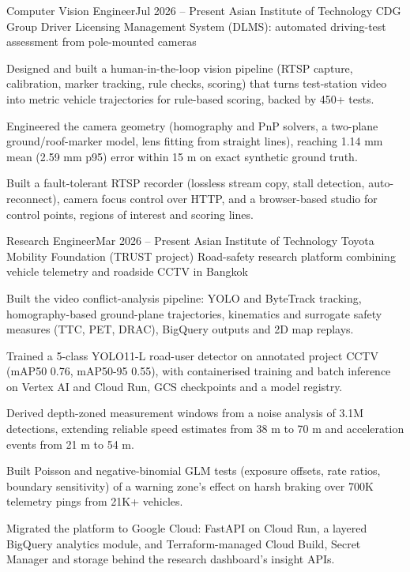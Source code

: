 \documentclass{aicv}
\begin{document}
\begin{cventry}{Computer Vision Engineer}{Jul 2026 -- Present}
  {Asian Institute of Technology \textperiodcentered{} CDG Group}
  {Driver Licensing Management System (DLMS): automated driving-test assessment from pole-mounted cameras}
  \item Designed and built a human-in-the-loop vision pipeline (RTSP capture, calibration, marker tracking, rule checks,
    scoring) that turns test-station video into metric vehicle trajectories for rule-based scoring, backed by 450+ tests.
  \item Engineered the camera geometry (homography and PnP solvers, a two-plane ground/roof-marker model, lens fitting
    from straight lines), reaching 1.14 mm mean (2.59 mm p95) error within 15 m on exact synthetic ground truth.
  \item Built a fault-tolerant RTSP recorder (lossless stream copy, stall detection, auto-reconnect), camera focus control
    over HTTP, and a browser-based studio for control points, regions of interest and scoring lines.
\end{cventry}

\begin{cventry}{Research Engineer}{Mar 2026 -- Present}
  {Asian Institute of Technology \textperiodcentered{} Toyota Mobility Foundation (TRUST project)}
  {Road-safety research platform combining vehicle telemetry and roadside CCTV in Bangkok}
  \item Built the video conflict-analysis pipeline: YOLO and ByteTrack tracking, homography-based ground-plane
    trajectories, kinematics and surrogate safety measures (TTC, PET, DRAC), BigQuery outputs and 2D map replays.
  \item Trained a 5-class YOLO11-L road-user detector on annotated project CCTV (mAP50 0.76, mAP50-95 0.55), with
    containerised training and batch inference on Vertex AI and Cloud Run, GCS checkpoints and a model registry.
  \item Derived depth-zoned measurement windows from a noise analysis of 3.1M detections, extending reliable speed
    estimates from 38 m to 70 m and acceleration events from 21 m to 54 m.
  \item Built Poisson and negative-binomial GLM tests (exposure offsets, rate ratios, boundary sensitivity) of a warning
    zone's effect on harsh braking over 700K telemetry pings from 21K+ vehicles.
  \item Migrated the platform to Google Cloud: FastAPI on Cloud Run, a layered BigQuery analytics module, and
    Terraform-managed Cloud Build, Secret Manager and storage behind the research dashboard's insight APIs.
\end{cventry}
\end{document}
